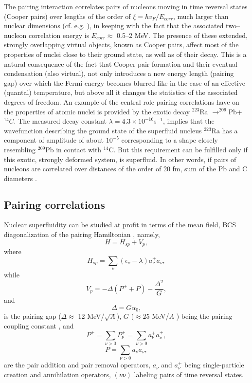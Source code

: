 \documentclass[a4paper,14pt]{book}
\begin{document}
The pairing interaction correlates pairs of nucleons moving in time reversal states (Cooper pairs) over lengths of the order of $\xi=\hbar v_F/E_{corr}$, much larger than nuclear dimensions (cf. e.g. \cite{Bohr:75}), in keeping with the fact that the associated two--nucleon correlation energy is $E_{corr}\approx$ 0.5--2 MeV. The presence of these
 extended, strongly overlapping virtual objects, known as Cooper pairs, affect most of the properties of nuclei close
to their ground state, as well as of their decay.
This is a natural consequence of the fact that Cooper pair formation and their eventual condensation (also virtual), not only introduces a new energy length (pairing gap) over which the Fermi energy becomes blurred like in the case of an effective (quantal) temperature, but above all it changes the statistics of the associated degrees of freedom. An example of the central role pairing correlations have on the properties of atomic nuclei is provided by the exotic decay $^{223}$Ra $\to ^{209}$Pb+ $^{14}C$. The measured decay constant 
$\lambda= 4.3 \times 10^{-16}$s${^{-1}}$,
implies that the wavefunction describing the ground state of the superfluid nucleus $^{223}$Ra has a component of amplitude of about $10^{-5}$
corresponding to a shape closely resembling $^{209}$Pb in contact with $^{14}$C. 
But this requirement can be fulfilled only if this exotic, strongly deformed system, is superfluid. In other words, if pairs of nucleons are correlated over 
distances of the order of 20 fm, sum of the Pb and C diameters \cite{Barranco:88}.


\subsection{Pairing correlations}

Nuclear superfluidity can be studied at profit in terms  of the mean field, BCS diagonalization
of the pairing Hamiltonian \cite{Bardeen:57both}, namely,
\begin{equation}
H = H_{sp} + V_p,
\label{H}
\end{equation}
where
\begin{equation}
H_{sp} = \sum_{\nu} (\epsilon_{\nu} - \lambda) a^+_{\nu} a_{\nu},
\label{Hsp}
\end{equation}
while 
\begin{equation}
V_p = - \Delta (P^+ + P) - \frac{\Delta^2}{G},
\label{Vp}
\end{equation}
and
\begin{equation}
\Delta = G \alpha_0,
\label{delta}
\end{equation}
is the pairing gap ($\Delta \approx$ 12 MeV/$\sqrt{A}$), $G$ ($\approx 25$ MeV/$A$ ) being the pairing coupling constant \cite{Bohr:75},
and 
\begin{equation}
P^+ = \sum_{\nu>0} P^+_{\nu}= \sum_{\nu>0} a^+_{\nu}a^+_{\bar \nu},
\label{P+}
\end{equation}
\begin{equation}
P = \sum_{\nu >0} a_{\bar \nu} a_{\nu},
\label{P-}
\end{equation}
are the pair addition and pair removal  operators, $a_{\nu}$ and $a^+_{\nu}$  being single-particle  creation  and annihilation  operators,
$(\nu \bar \nu)$ labeling pairs of time reversal states.
\end{document}
